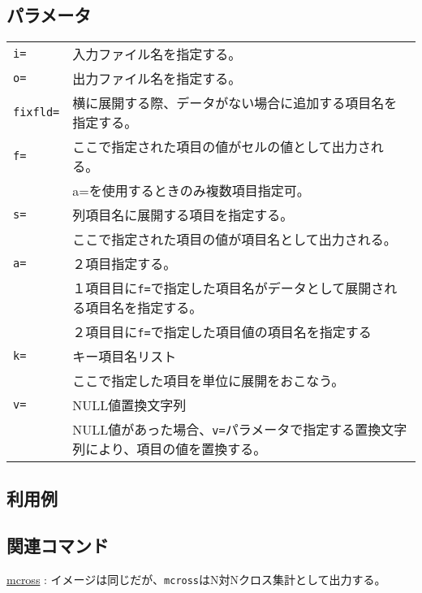 \subsection*{パラメータ}
\begin{table}[htbp]

{\small
\begin{tabular}{ll}
\verb|i=|    & 入力ファイル名を指定する。\\
\verb|o=|    & 出力ファイル名を指定する。\\
\verb|fixfld=| & 横に展開する際、データがない場合に追加する項目名を指定する。\\
\verb|f=|    & ここで指定された項目の値がセルの値として出力される。\\
             & a=を使用するときのみ複数項目指定可。\\
\verb|s=|    & 列項目名に展開する項目を指定する。\\
             & ここで指定された項目の値が項目名として出力される。\\
\verb|a=|    & ２項目指定する。\\
             & １項目目に\verb|f=|で指定した項目名がデータとして展開される項目名を指定する。\\
             & ２項目目に\verb|f=|で指定した項目値の項目名を指定する\\
\verb|k=|    & キー項目名リスト\\
             & ここで指定した項目を単位に展開をおこなう。\\
\verb|v=|    & NULL値置換文字列\\
             & NULL値があった場合、\verb|v=|パラメータで指定する置換文字列により、項目の値を置換する。\\
\end{tabular} 
}
\end{table} 

\subsection*{利用例}


\subsection*{関連コマンド}
\hyperref[sect:mcross]{mcross} : イメージは同じだが、\verb|mcross|はN対Nクロス集計として出力する。\\

%
